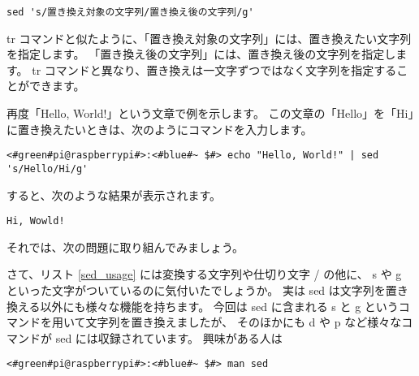\begin{lstlisting}[caption=sed コマンドの基本的な使い方, label=sed_usage]
sed 's/置き換え対象の文字列/置き換え後の文字列/g'
\end{lstlisting}

tr コマンドと似たように、「置き換え対象の文字列」には、置き換えたい文字列を指定します。
「置き換え後の文字列」には、置き換え後の文字列を指定します。
tr コマンドと異なり、置き換えは一文字ずつではなく文字列を指定することができます。

再度「Hello, World!」という文章で例を示します。
この文章の「Hello」を「Hi」に置き換えたいときは、次のようにコマンドを入力します。

\begin{lstlisting}[caption=sed コマンドを使った例, label=sed_app]
<#green#pi@raspberrypi#>:<#blue#~ $#> echo "Hello, World!" | sed 's/Hello/Hi/g'
\end{lstlisting}

すると、次のような結果が表示されます。

\begin{lstlisting}[caption=sed コマンドで変換した結果, label=sed_result]
Hi, Wowld!
\end{lstlisting}

それでは、次の問題に取り組んでみましょう。

\begin{tcolorbox}[title=\useOmetoi]
\begin{enumerate}
\end{enumerate}
\end{tcolorbox}

さて、リスト \ref{sed_usage} には変換する文字列や仕切り文字 / の他に、
s や g といった文字がついているのに気付いたでしょうか。
実は sed は文字列を置き換える以外にも様々な機能を持ちます。
今回は sed に含まれる s と g というコマンドを用いて文字列を置き換えましたが、
そのほかにも d や p など様々なコマンドが sed には収録されています。
興味がある人は

\begin{lstlisting}
<#green#pi@raspberrypi#>:<#blue#~ $#> man sed
\end{lstlisting}

